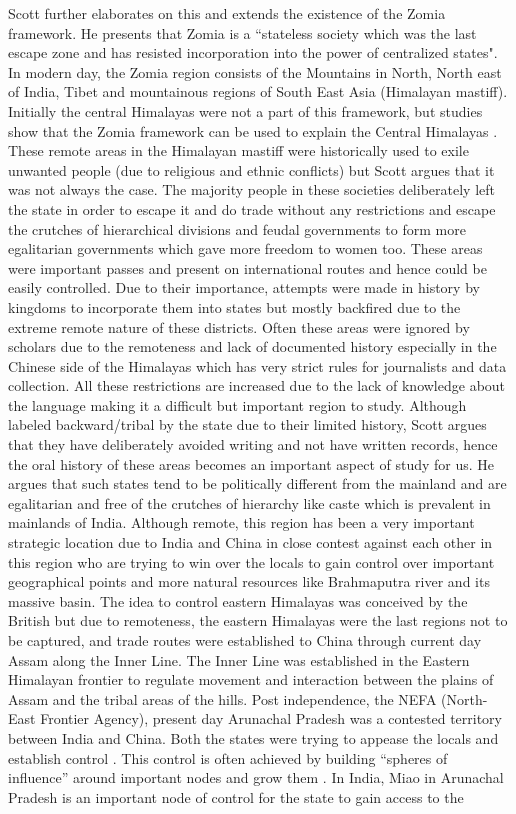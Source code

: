 \begin{sloppypar}
Scott \citep{jamesscott} further elaborates on this and extends the existence of the Zomia framework. He presents that Zomia is a ``stateless society which was the last escape zone and has resisted incorporation into the power of centralized states". In modern day, the Zomia region consists of the Mountains in North, North east of India, Tibet and mountainous regions of South East Asia (Himalayan mastiff). Initially the central Himalayas were not a part of this framework, but studies  show that the Zomia framework can be used to explain the Central Himalayas \citep{shneiderman2010central}.    These remote areas in the Himalayan mastiff were historically used to exile unwanted people (due to religious and ethnic conflicts) but Scott argues that it was not always the case. The majority people in these societies deliberately left the state in order to escape it and do trade without any restrictions and escape the crutches of hierarchical divisions and feudal governments to form more egalitarian governments which gave more freedom to women too. These areas were important passes and present on international routes and hence could be easily controlled. Due to their importance, attempts were made in history by kingdoms to incorporate them into states but mostly backfired due to the extreme remote nature of these districts. Often these areas were ignored by scholars due to the remoteness and lack of documented history especially in the Chinese side of the Himalayas which has very strict rules for journalists and data collection. All these restrictions are increased due to the lack of knowledge about the language making it a difficult but important region to study. Although labeled backward/tribal by the state due to their limited history, Scott argues that they have deliberately avoided writing and not have written records, hence the oral history of these areas becomes an important aspect of study for us. He argues that such states tend to be politically different from the mainland and are egalitarian and free of the crutches of hierarchy like caste which is prevalent in mainlands of India. Although remote, this region has been a very important strategic location due to India and China in close contest against each other in this region who are trying to win over the locals to gain control over important geographical points  and more natural resources like Brahmaputra river and its massive basin. The idea to control eastern Himalayas was conceived by the British but due to remoteness, the eastern Himalayas were the last regions not to be captured, and trade routes were established to China through current day Assam along the Inner Line. The Inner Line was established in the Eastern Himalayan frontier to regulate movement and interaction between the plains of Assam and the tribal areas of the hills. Post independence, the NEFA (North-East Frontier Agency), present day Arunachal Pradesh was a contested territory between India and China. Both the states were trying to appease the locals and establish control \citep{guyot2017shadow}. This control is often achieved by building \enquote{spheres of influence} around important nodes and grow them \citep{Farrelly_2013b}. In India, Miao in Arunachal Pradesh is an important node of control for the state to gain access to the 
\end{sloppypar}
